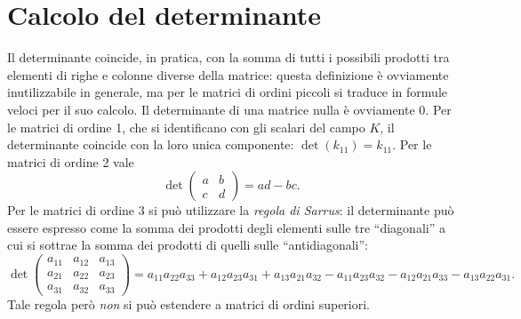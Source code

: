 \section{Calcolo del determinante}
Il determinante coincide, in pratica, con la somma di tutti i possibili prodotti tra elementi di righe e colonne diverse della matrice: questa definizione è ovviamente inutilizzabile in generale, ma per le matrici di ordini piccoli si traduce in formule veloci per il suo calcolo.
Il determinante di una matrice nulla è ovviamente 0.
Per le matrici di ordine 1, che si identificano con gli scalari del campo $K$, il determinante coincide con la loro unica componente: $\det(k_{11})=k_{11}$.
Per le matrici di ordine 2 vale
\begin{equation*}
	\det
	\begin{pmatrix}
		a&b\\c&d
	\end{pmatrix}
	=ad-bc.
\end{equation*}
Per le matrici di ordine 3 si può utilizzare la \emph{regola di Sarrus}: il determinante può essere espresso come la somma dei prodotti degli elementi sulle tre ``diagonali'' a cui si sottrae la somma dei prodotti di quelli sulle ``antidiagonali'':
\begin{equation*}
	\det
	\begin{pmatrix}
		a_{11}&a_{12}&a_{13}\\
		a_{21}&a_{22}&a_{23}\\
		a_{31}&a_{32}&a_{33}
	\end{pmatrix}
	=a_{11}a_{22}a_{33}+a_{12}a_{23}a_{31}+a_{13}a_{21}a_{32}-a_{11}a_{23}a_{32}-a_{12}a_{21}a_{33}-a_{13}a_{22}a_{31}.
\end{equation*}
Tale regola però \emph{non} si può estendere a matrici di ordini superiori.

